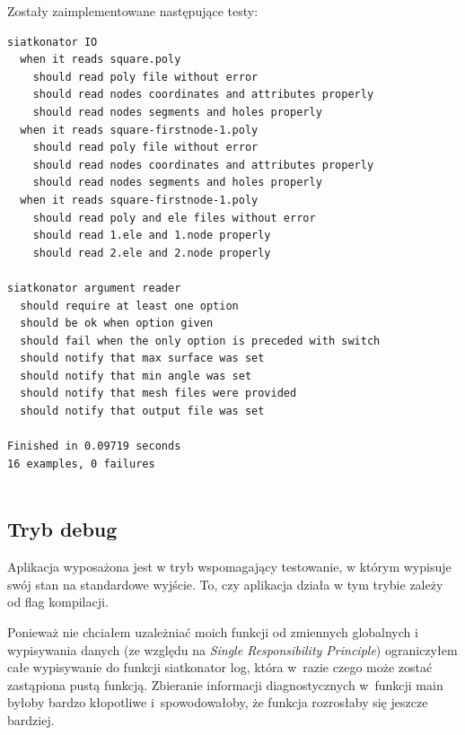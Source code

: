 \documentclass[a4paper]{article} \usepackage{setspace}
\begin{document}
Zostały zaimplementowane następujące testy:
\begin{lstlisting}[caption=Testy automatyczne]
siatkonator IO                                            
  when it reads square.poly                               
    should read poly file without error                   
    should read nodes coordinates and attributes properly 
    should read nodes segments and holes properly         
  when it reads square-firstnode-1.poly                   
    should read poly file without error                   
    should read nodes coordinates and attributes properly 
    should read nodes segments and holes properly         
  when it reads square-firstnode-1.poly                   
    should read poly and ele files without error          
    should read 1.ele and 1.node properly                 
    should read 2.ele and 2.node properly                 
                                                          
siatkonator argument reader                               
  should require at least one option                      
  should be ok when option given                          
  should fail when the only option is preceded with switch
  should notify that max surface was set                  
  should notify that min angle was set                    
  should notify that mesh files were provided             
  should notify that output file was set                  
                                                          
Finished in 0.09719 seconds                               
16 examples, 0 failures                                   
                                                          
\end{lstlisting}

\subsection{Tryb debug}
Aplikacja wyposażona jest w tryb wspomagający testowanie, w którym wypisuje swój stan na standardowe wyjście.
To, czy aplikacja działa w tym trybie zależy od flag kompilacji.

Ponieważ nie chciałem uzależniać moich funkcji od zmiennych globalnych i wypisywania danych (ze względu na \emph{Single Responsibility Principle}) ograniczyłem całe wypisywanie do funkcji siatkonator log,
która w~razie czego może zostać zastąpiona pustą funkcją. Zbieranie informacji diagnostycznych w~funkcji main byłoby bardzo kłopotliwe i~spowodowałoby, że funkcja rozrosłaby się jeszcze bardziej.
\end{document}
